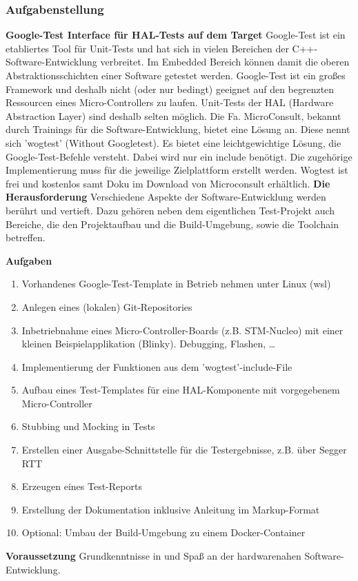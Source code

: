 \documentclass[12pt,a4paper]{article}
\begin{document}
\newpage
\subsubsection{Aufgabenstellung}
\textbf{Google-Test Interface für HAL-Tests auf dem Target}
\newline
Google-Test ist ein etabliertes Tool für Unit-Tests und hat sich in vielen Bereichen der C++-Software-Entwicklung verbreitet. Im Embedded Bereich können damit die oberen Abstraktionsschichten einer Software getestet werden. Google-Test ist ein großes Framework und deshalb nicht (oder nur bedingt) geeignet auf den begrenzten Ressourcen eines Micro-Controllers zu laufen. Unit-Tests der HAL (Hardware Abstraction Layer) sind deshalb selten möglich.
Die Fa. MicroConsult, bekannt durch Trainings für die Software-Entwicklung, bietet eine Lösung an. Diese nennt sich 'wogtest' (Without Googletest). Es bietet eine leichtgewichtige Lösung, die Google-Test-Befehle versteht. Dabei wird nur ein include benötigt. Die zugehörige Implementierung muss für die jeweilige Zielplattform erstellt werden.
Wogtest ist frei und kostenlos samt Doku im Download von Microconsult erhältlich.
\newline\newline
\textbf{Die Herausforderung}
\newline
Verschiedene Aspekte der Software-Entwicklung werden berührt und vertieft. Dazu gehören neben dem eigentlichen Test-Projekt auch Bereiche, die den Projektaufbau und die Build-Umgebung, sowie die Toolchain betreffen. 
\newline

\textbf{Aufgaben}
\begin{enumerate}
  \item Vorhandenes Google-Test-Template in Betrieb nehmen unter Linux (wsl)
  \item Anlegen eines (lokalen) Git-Repositories
  \item Inbetriebnahme eines Micro-Controller-Boards (z.B. STM-Nucleo) mit einer kleinen Beispielapplikation (Blinky). Debugging, Flashen, …
  \item Implementierung der Funktionen aus dem 'wogtest'-include-File
  \item Aufbau eines Test-Templates für eine HAL-Komponente mit vorgegebenem Micro-Controller
  \item Stubbing und Mocking in Tests
  \item Erstellen einer Ausgabe-Schnittstelle für die Testergebnisse, z.B. über Segger RTT
  \item Erzeugen eines Test-Reports
  \item Erstellung der Dokumentation inklusive Anleitung im Markup-Format
  \item Optional: Umbau der Build-Umgebung zu einem Docker-Container\newline
\end{enumerate}
\textbf{Voraussetzung}
\newline
Grundkenntnisse in und Spaß an der hardwarenahen Software-Entwicklung.
\end{document}
